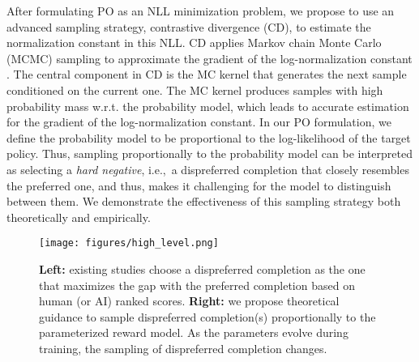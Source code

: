 After formulating PO as an NLL minimization problem, we propose to use an advanced sampling strategy, contrastive divergence (CD), to estimate the normalization constant in this NLL. 
CD applies Markov chain Monte Carlo (MCMC) sampling to approximate the gradient of the log-normalization constant \citep{hinton2002training}. 
The central component in CD is the MC kernel that generates the next sample conditioned on the current one. 
The MC kernel produces samples with high probability mass w.r.t. the probability model, which leads to accurate estimation for the gradient of the log-normalization constant. 
In our PO formulation, we define the probability model to be proportional to the log-likelihood of the target policy. Thus, sampling proportionally to the probability model can be interpreted as selecting a \textit{hard negative}, i.e.,~a dispreferred completion that closely resembles the preferred one, and thus, makes it challenging for the model to distinguish between them. 
We demonstrate the effectiveness of this sampling strategy both theoretically and empirically.

\begin{figure}[t]
\centering
\begin{minipage}{.99\columnwidth}
\centering
    \texttt{[image: figures/high\_level.png]}
\end{minipage}
\caption{
\textbf{Left:} existing studies choose a dispreferred completion as the one that maximizes the gap with the preferred completion based on human (or AI) ranked scores.
\textbf{Right:} we propose theoretical guidance to sample dispreferred completion(s) proportionally to the parameterized reward model.
As the parameters evolve during training, the sampling of dispreferred completion changes.
}
\label{fig: high level demonstration}
\end{figure}

